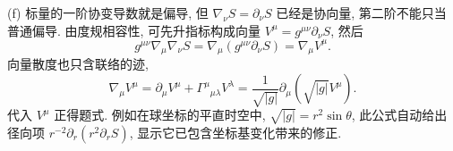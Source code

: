 \begin{solution}
(f) 标量的一阶协变导数就是偏导, 但 $\nabla_\nu S=\partial_\nu S$ 已经是协向量, 第二阶不能只当普通偏导. 由度规相容性, 可先升指标构成向量 $V^\mu=g^{\mu\nu}\partial_\nu S$, 然后
\[
 g^{\mu\nu}\nabla_\mu\nabla_\nu S
 =\nabla_\mu(g^{\mu\nu}\partial_\nu S)=\nabla_\mu V^\mu.
\]
向量散度也只含联络的迹,
\[
 \nabla_\mu V^\mu=\partial_\mu V^\mu
 +\Gamma^\mu{}_{\mu\lambda}V^\lambda
 =\frac1{\sqrt{|g|}}\partial_\mu(\sqrt{|g|}V^\mu).
\]
代入 $V^\mu$ 正得题式. 例如在球坐标的平直时空中, $\sqrt{|g|}=r^2\sin\theta$, 此公式自动给出径向项 $r^{-2}\partial_r(r^2\partial_rS)$, 显示它已包含坐标基变化带来的修正.
\end{solution}
